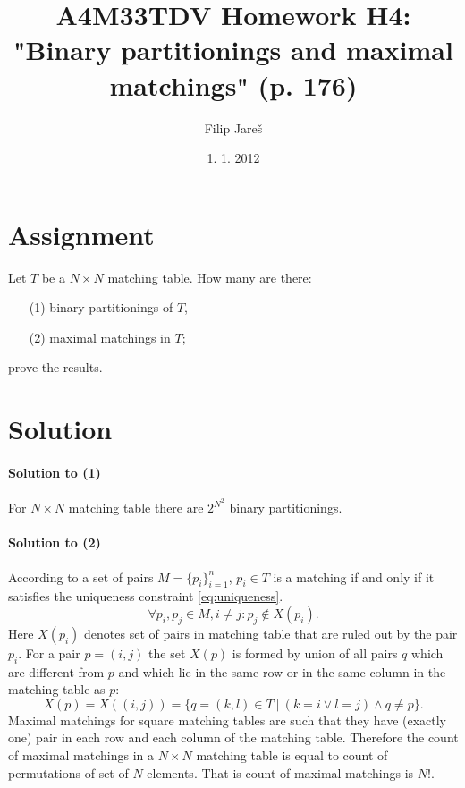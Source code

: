 \documentclass[11pt,oneside,a4paper,pdftex]{article}   %
\title{A4M33TDV Homework H4: "Binary partitionings and maximal matchings" (p. 176)}
\date{1. 1. 2012}
\author{Filip Jareš}
\begin{document}

\maketitle

\section{Assignment}

Let $T$ be a $N\times N$ matching table.  How many are there:
\begin{enumerate}
	\item[(1)] binary partitionings of $T$,
	\item[(2)] maximal matchings in $T$;
\end{enumerate}
prove the results.


\section{Solution}

\paragraph{Solution to (1)}

For $N \times N$ matching table there are $2^{N^2}$ binary partitionings.

\paragraph{Solution to (2)}

According to \cite[p. 168]{SaraLectures} a set of pairs $M = \{p_i\}_{i=1}^n$,
$p_i \in T$ is a matching if and only if it satisfies the uniqueness constraint
\eqref{eq:uniqueness}.
	\begin{equation}
		\label{eq:uniqueness}
		\forall p_i, p_j \in M, i \ne j: p_j \notin X(p_i).
	\end{equation}
Here $X(p_i)$ denotes set of pairs in matching table that are ruled out by the
pair $p_i$. For a pair $p = (i, j)$ the set $X(p)$ is formed by union of all
pairs $q$ which are different from $p$ and which lie in the same row or in
the same column in the matching table as $p$:
	\begin{equation}
		X(p)	= X((i, j))
			= \{ q = (k,l) \in T \ |\ 
			  (k = i \vee l = j) \wedge q \ne p \}.
	\end{equation}
Maximal matchings for square matching tables are such that they have (exactly
one) pair in each row and each column of the matching table. Therefore the count
of maximal matchings in a $N \times N$ matching table is equal to count of
permutations of set of $N$ elements. That is count of maximal matchings is $N!$.
\end{document}

